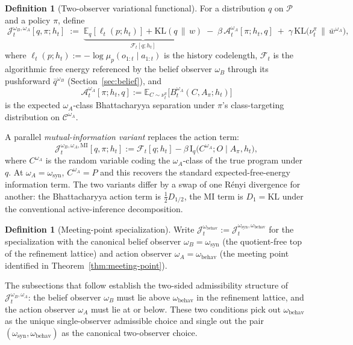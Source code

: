 \documentclass[11pt]{article}
\theoremstyle{definition}
\newtheorem{definition}[theorem]{Definition}
\theoremstyle{remark}
\newcommand{\Ccal}{\mathcal{C}}
\newcommand{\Pcal}{\mathcal{P}}
\newcommand{\E}{\mathbb{E}}
\newcommand{\KL}{\mathrm{KL}}
\newcommand{\I}{\mathrm{I}}
\newcommand{\givena}{\,\|\,}
\newcommand{\ellp}{\ell}
\begin{document}
\begin{definition}[Two-observer variational functional]
\label{def:two-observer-functional}
For a distribution $q$ on $\Pcal$ and a policy $\pi$, define
\[
\boxed{\;
\mathcal J_t^{\omega_B,\omega_A}[q,\pi;h_t]
\;:=\;
\underbrace{\E_q[\ellp_t(p;h_t)]+\KL(q\givena w)}_{\mathcal F_t[q;h_t]}
\;-\;\beta\,\mathcal A_t^{\omega_A}[\pi;h_t,q]
\;+\;\gamma\,\KL\!\bigl(\nu_t^\pi\,\|\,\bar w^{\omega_A}\bigr),
\;}
\]
where $\ellp_t(p;h_t):=-\log\mu_p(o_{1:t}\mid a_{1:t})$ is the history codelength, $\mathcal F_t$ is the algorithmic free energy referenced by the belief observer $\omega_B$ through its pushforward $\bar q^{\omega_B}$ (Section~\ref{sec:belief}), and
\[
\mathcal A_t^{\omega_A}[\pi;h_t,q]:=\E_{C\sim\nu_t^\pi}\bigl[B_t^{\omega_A}(C,A_\pi;h_t)\bigr]
\]
is the expected $\omega_A$-class Bhattacharyya separation under $\pi$'s class-targeting distribution on $\Ccal^{\omega_A}$.
\end{definition}

A parallel \emph{mutual-information variant} replaces the action term:
\[
\mathcal J_t^{\omega_B,\omega_A,\mathrm{MI}}[q,\pi;h_t]
:=\mathcal F_t[q;h_t]-\beta\,\I_q\!\bigl(C^{\omega_A};O\mid A_\pi,h_t\bigr),
\]
where $C^{\omega_A}$ is the random variable coding the $\omega_A$-class of the true program under $q$. At $\omega_A=\omega_{\mathrm{syn}}$, $C^{\omega_A}=P$ and this recovers the standard expected-free-energy information term. The two variants differ by a swap of one R\'enyi divergence for another: the Bhattacharyya action term is $\tfrac{1}{2}D_{1/2}$, the MI term is $D_1=\KL$ under the conventional active-inference decomposition.

\begin{definition}[Meeting-point specialization]
\label{def:meeting-point-shorthand}
Write $\mathcal J_t^{\omega_{\mathrm{behav}}}:=\mathcal J_t^{\omega_{\mathrm{syn}},\omega_{\mathrm{behav}}}$ for the specialization with the canonical belief observer $\omega_B=\omega_{\mathrm{syn}}$ (the quotient-free top of the refinement lattice) and action observer $\omega_A=\omega_{\mathrm{behav}}$ (the meeting point identified in Theorem~\ref{thm:meeting-point}).
\end{definition}

The subsections that follow establish the two-sided admissibility structure of $\mathcal J_t^{\omega_B,\omega_A}$: the belief observer $\omega_B$ must lie above $\omega_{\mathrm{behav}}$ in the refinement lattice, and the action observer $\omega_A$ must lie at or below. These two conditions pick out $\omega_{\mathrm{behav}}$ as the unique single-observer admissible choice and single out the pair $(\omega_{\mathrm{syn}},\omega_{\mathrm{behav}})$ as the canonical two-observer choice.
\end{document}
